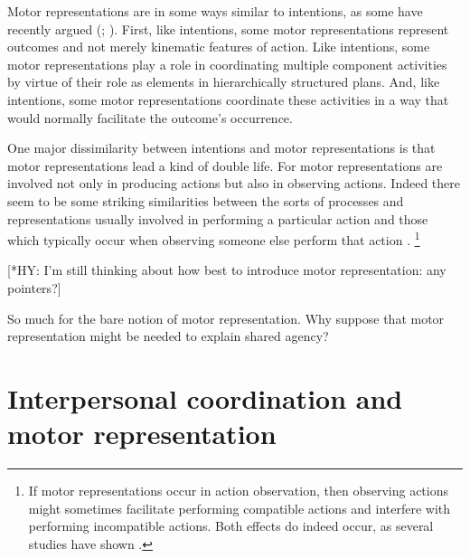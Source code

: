 \documentclass[12pt,\papersize]{extarticle}
\begin{document}
Motor representations are in some ways similar to intentions,
as some have recently argued (\citealp[pp.\ 189-90]{pacherie:2008_action}; \citealp{butterfill:2012_intention}).
First, like intentions, some motor representations represent outcomes and not merely kinematic features of action.
Like intentions, some motor representations play a role in coordinating multiple  component activities by virtue of their role as elements in hierarchically structured plans.
And, like intentions, some motor representations coordinate these activities in a way that would normally facilitate the outcome’s occurrence.

One major dissimilarity between intentions and motor representations is that motor representations lead a kind of double life.
For motor representations are involved not only in producing actions but also in observing actions. Indeed there seem to be some striking similarities between the sorts of processes and representations usually involved in performing a particular action and those which typically occur when observing someone else perform that action \citep{rizzolatti_functional_2010,rizzolatti_mirrors_2008}.%
\footnote{ 
If motor representations occur in action observation, then observing actions might sometimes facilitate performing compatible actions and interfere with performing incompatible actions.  Both effects do indeed occur, as several studies have shown \citep{brass:2000_compatibility, craighero:2002_hand, kilner:2003_interference, costantini:2012_does}. 
}


[*HY: I'm still thinking about how best to introduce motor representation: any pointers?]


So much for the bare notion of motor representation.
Why suppose that motor representation might be needed to explain shared agency?


\section{Interpersonal coordination and motor representation}
\end{document}
